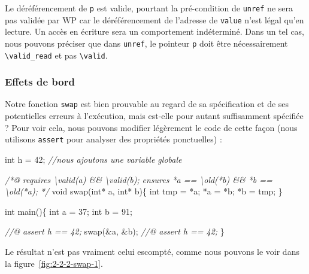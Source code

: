 \documentclass[12pt,francais,]{scrbook}
\newenvironment{Shaded}{}{}
\newcommand{\DataTypeTok}[1]{\textcolor[rgb]{0.56,0.13,0.00}{{#1}}}
\newcommand{\DecValTok}[1]{\textcolor[rgb]{0.25,0.63,0.44}{{#1}}}
\newcommand{\CommentTok}[1]{\textcolor[rgb]{0.38,0.63,0.69}{\textit{{#1}}}}
\newcommand{\NormalTok}[1]{{#1}}
\begin{document}
Le déréférencement de \texttt{p} est valide, pourtant la pré-condition
de \texttt{unref} ne sera pas validée par WP car le déréférencement de
l'adresse de \texttt{value} n'est légal qu'en lecture. Un accès en
écriture sera un comportement indéterminé. Dans un tel cas, nous pouvons
préciser que dans \texttt{unref}, le pointeur \texttt{p} doit être
nécessairement \texttt{\textbackslash{}valid\_read} et pas
\texttt{\textbackslash{}valid}.

\subsubsection{Effets de bord}\label{effets-de-bord}

Notre fonction \texttt{swap} est bien prouvable au regard de sa
spécification et de ses potentielles erreurs à l'exécution, mais
est-elle pour autant suffisamment spécifiée ? Pour voir cela, nous
pouvons modifier légèrement le code de cette façon (nous utilisons
\texttt{assert} pour analyser des propriétés ponctuelles) :

\begin{footnotesize}\begin{Shaded}
\begin{Highlighting}[]
\DataTypeTok{int} \NormalTok{h = }\DecValTok{42}\NormalTok{; }\CommentTok{//nous ajoutons une variable globale}

\CommentTok{/*@}
\CommentTok{  requires \textbackslash{}valid(a) && \textbackslash{}valid(b);}
\CommentTok{  ensures  *a == \textbackslash{}old(*b) && *b == \textbackslash{}old(*a);}
\CommentTok{*/}
\DataTypeTok{void} \NormalTok{swap(}\DataTypeTok{int}\NormalTok{* a, }\DataTypeTok{int}\NormalTok{* b)\{}
  \DataTypeTok{int} \NormalTok{tmp = *a;}
  \NormalTok{*a = *b;}
  \NormalTok{*b = tmp;}
\NormalTok{\}}

\DataTypeTok{int} \NormalTok{main()\{}
  \DataTypeTok{int} \NormalTok{a = }\DecValTok{37}\NormalTok{;}
  \DataTypeTok{int} \NormalTok{b = }\DecValTok{91}\NormalTok{;}

  \CommentTok{//@ assert h == 42;}
  \NormalTok{swap(&a, &b);}
  \CommentTok{//@ assert h == 42;}
\NormalTok{\}}
\end{Highlighting}
\end{Shaded}\end{footnotesize}

Le résultat n'est pas vraiment celui escompté, comme nous pouvons le
voir dans la figure~\ref{fig:2-2-2-swap-1}.
\end{document}

